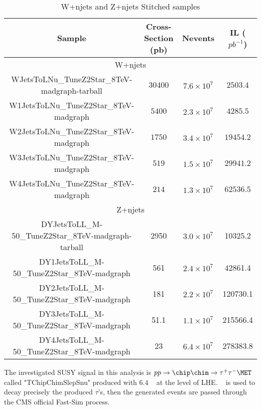 \begin{table}[!h]
\begin{center}
\begin{tabular}{|c|c|c|c|}
\hline\hline
Sample & Cross-Section (pb)   & Nevents  & IL ($pb^{-1}$) \\ \hline
\multicolumn{4}{|c|}{W+njets} \\\hline

WJetsToLNu\_TuneZ2Star\_8TeV-madgraph-tarball & $30400$    & $7.6\times 10^{7}$ & $2503.4$ \\ \hline
W1JetsToLNu\_TuneZ2Star\_8TeV-madgraph        & $5400$     & $2.3\times 10^{7}$ & $4285.5$ \\ \hline
W2JetsToLNu\_TuneZ2Star\_8TeV-madgraph        & $1750$     & $3.4\times 10^{7}$ & $19454.2$\\ \hline
W3JetsToLNu\_TuneZ2Star\_8TeV-madgraph        & $519$      & $1.5\times 10^{7}$ & $29941.2$\\ \hline
W4JetsToLNu\_TuneZ2Star\_8TeV-madgraph        & $214$      & $1.3\times 10^{7}$ & $62536.5$\\ \hline
\multicolumn{4}{|c|}{Z+njets} \\\hline
DYJetsToLL\_M-50\_TuneZ2Star\_8TeV-madgraph-tarball & 2950 & $3.0\times 10^{7}$ & 10325.2 \\ \hline
DY1JetsToLL\_M-50\_TuneZ2Star\_8TeV-madgraph        & 561  & $2.4\times 10^{7}$ & 42861.4\\ \hline
DY2JetsToLL\_M-50\_TuneZ2Star\_8TeV-madgraph        & 181  & $2.2\times 10^{7}$ & 120730.1\\ \hline
DY3JetsToLL\_M-50\_TuneZ2Star\_8TeV-madgraph        & 51.1 & $1.1\times 10^{7}$ & 215566.4\\ \hline
DY4JetsToLL\_M-50\_TuneZ2Star\_8TeV-madgraph        & 23   & $6.4\times 10^{7}$ & 278383.8\\ \hline


\hline

\end{tabular}
\end{center}
\caption{W+njets and Z+njets Stitched samples}
\label{Tab.Stitching}
\end{table}


The investigated SUSY signal in this analysis is {\small $pp \rightarrow \chip \chim \rightarrow \tau^+ \tau^- \MET$} called {\small "TChipChimSlepSnu"} produced with \PYTHIA $6.4$ ~\cite{PYTHIA} at the level of LHE. \TAUOLA ~\cite{TAUOLA} is used to decay precisely the produced $\tau$'s, then the generated events are passed through the CMS official Fast-Sim process.

